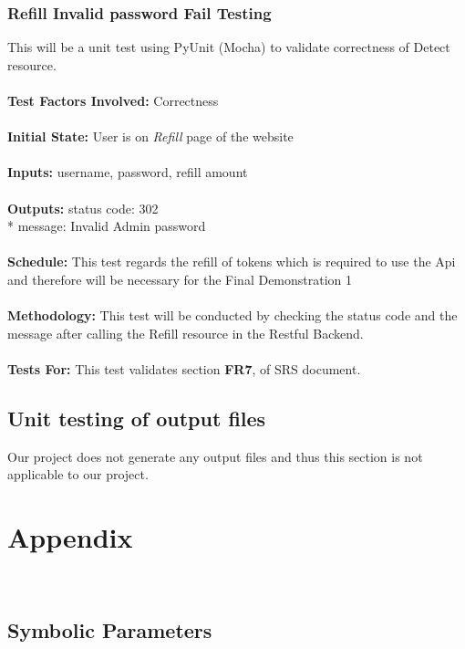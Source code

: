 \documentclass[12pt, titlepage]{article}
\begin{document}
\subsubsection{{Refill Invalid password Fail Testing}}
This will be a unit test using PyUnit (Mocha) to validate correctness of Detect resource. \\
\\
\textbf{Test Factors Involved:} Correctness \\
\\
\textbf{Initial State: } User is on \textit{Refill} page of the website \\
\\
\textbf{Inputs: } username, password, refill amount \\
\\
\textbf{Outputs:} status code: 302 \\*
                  message: Invalid Admin password \\
\\
\textbf{Schedule:} This test regards the refill of tokens which is required to use the Api and therefore will be necessary for the Final Demonstration 1 \\
\\
\textbf{Methodology: } This test will be conducted by checking the status code and the message after calling the Refill resource in the Restful Backend. \\
\\
\textbf{Tests For:} This test validates section \textbf{FR7}, of SRS document.
		
\subsection{Unit testing of output files}	
Our project does not generate any output files and thus this section is not applicable to our project.





\newpage

\section{Appendix}\

\subsection{Symbolic Parameters}
\end{document}
